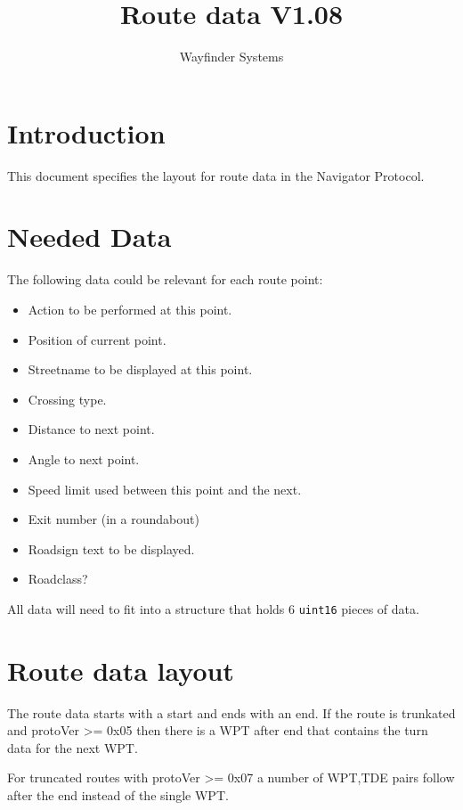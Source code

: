 \documentclass[a4paper]{article}
\title{Route data V1.08}
\author{Wayfinder Systems}
\begin{document}
\maketitle


\section{Introduction}

This document specifies the layout for route data in the Navigator Protocol.

\section{Needed Data}

The following data could be relevant for each route point:

\begin{itemize}

  \item Action to be performed at this point.
  \item Position of current point.
  \item Streetname to be displayed at this point.
  \item Crossing type.

  \item Distance to next point.
  \item Angle to next point.
  \item Speed limit used between this point and the next.

  \item Exit number (in a roundabout)
  \item Roadsign text to be displayed.

  \item Roadclass?
\end{itemize}

All data will need to fit into a structure that holds 6 {\tt uint16}
pieces of data.

\newpage

\section{Route data layout}

The route data starts with a start and ends with an end. If the route is
trunkated and protoVer >= 0x05 then there is a WPT after end that contains
the turn data for the next WPT.

For truncated routes with protoVer >= 0x07 a number of WPT,TDE pairs follow 
after the end instead of the single WPT. 
\end{document}
